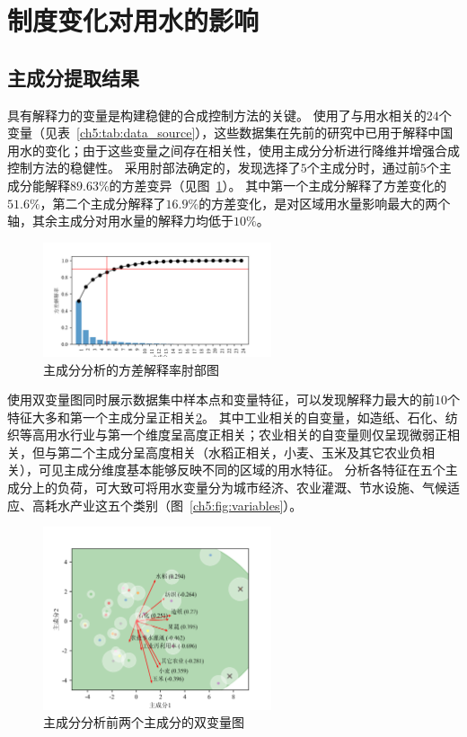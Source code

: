 

\section{制度变化对用水的影响}

\subsection{主成分提取结果}

具有解释力的变量是构建稳健的合成控制方法的关键。
使用了与用水相关的$24$个变量（见表~\ref{ch5:tab:data_source}），这些数据集在先前的研究中已用于解释中国用水的变化\cite{zhou2020}；由于这些变量之间存在相关性，使用主成分分析进行降维并增强合成控制方法的稳健性。
采用肘部法确定的，发现选择了$5$个主成分时，通过前$5$个主成分能解释$89.63\%$的方差变异（见图~\ref{ch5:fig:elbow}）。
其中第一个主成分解释了方差变化的$51.6\%$，第二个主成分解释了$16.9\%$的方差变化，是对区域用水量影响最大的两个轴，其余主成分对用水量的解释力均低于$10\%$。

\begin{figure}[htb]
    \centering
    \includegraphics[width=0.6\textwidth]{img/ch5/ch5_elbow.png}
    \caption{主成分分析的方差解释率肘部图}\label{ch5:fig:elbow}
\end{figure}

使用双变量图同时展示数据集中样本点和变量特征，可以发现解释力最大的前$10$个特征大多和第一个主成分呈正相关\ref{ch5:fig:biplot}。
其中工业相关的自变量，如造纸、石化、纺织等高用水行业与第一个维度呈高度正相关；农业相关的自变量则仅呈现微弱正相关，但与第二个主成分呈高度相关（水稻正相关，小麦、玉米及其它农业负相关），可见主成分维度基本能够反映不同的区域的用水特征。
分析各特征在五个主成分上的负荷，可大致可将用水变量分为城市经济、农业灌溉、节水设施、气候适应、高耗水产业这五个类别（图~\ref{ch5:fig:variables}）。


\begin{figure}[htb]
    \centering
    \includegraphics[width=0.6\textwidth]{img/ch5/ch5_biplot.png}
    \caption{主成分分析前两个主成分的双变量图}\label{ch5:fig:biplot}
\end{figure}


